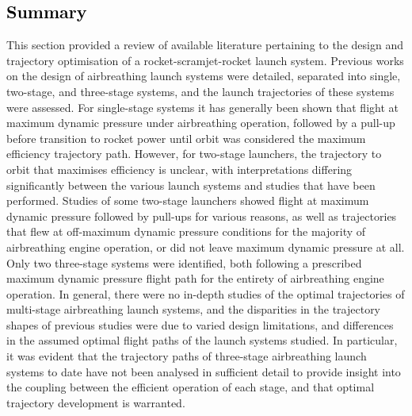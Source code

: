       \textcolor{black}{
      \section{Summary}
    }
\noindent
This section provided a review of available literature pertaining to the design and trajectory optimisation of a rocket-scramjet-rocket launch system.    
       Previous works on the design of airbreathing launch systems were detailed, separated into single, two-stage, and three-stage systems, and the launch trajectories of these systems were assessed. For single-stage systems it has generally been shown that flight at maximum dynamic pressure under airbreathing operation, followed by a pull-up before transition to rocket power until orbit was considered the maximum efficiency trajectory path. However, for two-stage launchers, the  trajectory to orbit that maximises efficiency is unclear, with interpretations differing significantly between the various launch systems and studies that have been performed. Studies of some two-stage launchers showed flight at maximum dynamic pressure followed by pull-ups for various reasons, as well as trajectories that flew at off-maximum dynamic pressure conditions for the majority of airbreathing engine operation, or did not leave maximum dynamic pressure at all. Only two three-stage systems were identified, both following a prescribed maximum dynamic pressure flight path for the entirety of airbreathing engine operation. In general, there were no in-depth studies of the optimal trajectories of multi-stage airbreathing launch systems, and the disparities in the trajectory shapes of previous studies were due to varied design limitations, and differences in the assumed optimal flight paths of the launch systems studied. In particular, it was evident that the trajectory paths of three-stage airbreathing launch systems to date have not been analysed in sufficient detail to provide insight into the coupling between the efficient operation of each stage, and that optimal trajectory development is warranted. 
       
